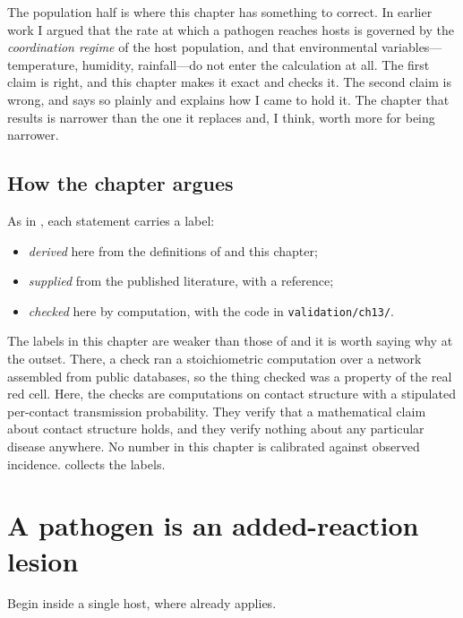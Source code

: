 The population half is where this chapter has something to correct. In
earlier work I argued that the rate at which a pathogen reaches hosts is
governed by the \emph{coordination regime} of the host population, and that
environmental variables---temperature, humidity, rainfall---do not enter the
calculation at all. The first claim is right, and this chapter makes it
exact and checks it. The second claim is wrong, and
 says so plainly and explains how I came to hold
it. The chapter that results is narrower than the one it replaces and, I
think, worth more for being narrower.

\subsection*{How the chapter argues}

As in , each statement carries a label:
\begin{itemize}[nosep]
\item \lnkD{} \emph{derived} here from the definitions of
       and this chapter;
\item \lnkS{} \emph{supplied} from the published literature, with a
      reference;
\item \lnkC{} \emph{checked} here by computation, with the code in
      \texttt{validation/ch13/}.
\end{itemize}
The \lnkC{} labels in this chapter are weaker than those of
 and it is worth saying why at the outset. There,
a check ran a stoichiometric computation over a network assembled from
public databases, so the thing checked was a property of the real red cell.
Here, the checks are computations on contact structure with a stipulated
per-contact transmission probability. They verify that a mathematical claim
about contact structure holds, and they verify nothing about any particular
disease anywhere. No number in this chapter is calibrated against observed
incidence.  collects the labels.

\section{A pathogen is an added-reaction lesion}
\label{sm:sec:pathogen-lesion}

Begin inside a single host, where  already applies.

